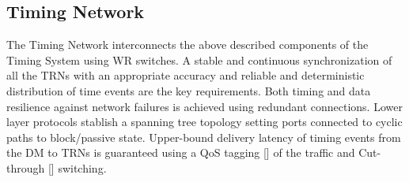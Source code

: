 \subsection{Timing Network}

The Timing Network interconnects the above described components of the Timing
System using WR switches. A stable and continuous synchronization of all the
TRNs with an appropriate accuracy and reliable and deterministic distribution 
of time events are the key requirements. 
Both timing and data resilience against network failures is achieved 
using redundant connections. Lower layer protocols
stablish a spanning tree topology setting ports connected to
cyclic paths to block/passive state. Upper-bound delivery latency of timing events 
from the DM to TRNs is guaranteed using a QoS tagging [] of the traffic and Cut-through [] switching.

